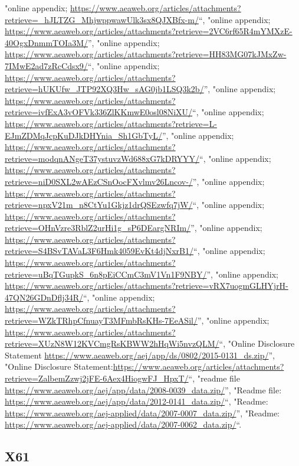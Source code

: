 \documentclass[]{article}
\newcommand{\fullline}{\noindent\makebox[\linewidth]{\rule{\textwidth}{0.4pt}}}
\begin{document}
\begin{itemize}
  "online appendix;
  \url{https://www.aeaweb.org/articles/attachments?retrieve=_hJLTZG_MhjwppwawUlk3sx8QJXBfx-m/}``,
  "online appendix;
  \url{https://www.aeaweb.org/articles/attachments?retrieve=2VC6rf65R4mYMXzE-40OgxDnmmTOIa3M/}'',
  "online appendix;
  \url{https://www.aeaweb.org/articles/attachments?retrieve=HH83MG07kJMxZw-7IMwE2ad7zRcCdsx9/}``,
  "online appendix;
  \url{https://www.aeaweb.org/articles/attachments?retrieve=hUKUfw_JTP92XQ3Hw_sAG0jb1LSQ3k2b/}'',
  "online appendix;
  \url{https://www.aeaweb.org/articles/attachments?retrieve=ivfExA3vOFVk336ZlKKmwE0osl08NiXU/}``,
  "online appendix;
  \url{https://www.aeaweb.org/articles/attachments?retrieve=L-EJmZDMqJcpKuDJkDHYnia_Sh1GbTyL/}'',
  "online appendix;
  \url{https://www.aeaweb.org/articles/attachments?retrieve=modqnANgeT37ystuvzWd688xG7kDRYYY/}``,
  "online appendix;
  \url{https://www.aeaweb.org/articles/attachments?retrieve=niD0SXL2wAEzCSnOocFXvlmv26Lncov-/}'',
  "online appendix;
  \url{https://www.aeaweb.org/articles/attachments?retrieve=npxV21m_n8CtYu1Gkjz1drQSEzwfq7jW/}``,
  "online appendix;
  \url{https://www.aeaweb.org/articles/attachments?retrieve=OHnVzre3RblZ2urHi1g_sP6DEargNRIm/}'',
  "online appendix;
  \url{https://www.aeaweb.org/articles/attachments?retrieve=S4BSvTAVaL3F6Hmk4059EvKt4djNxrB1/}``,
  "online appendix;
  \url{https://www.aeaweb.org/articles/attachments?retrieve=uBqTGupkS_6n8pEiCCmC3mV1Vn1F9NBY/}'',
  "online appendix;
  \url{https://www.aeaweb.org/articles/attachments?retrieve=vRX7uogmGLHYjrH-47QN26GDnDflj34R/}``,
  "online appendix;
  \url{https://www.aeaweb.org/articles/attachments?retrieve=WZkTRhpCfnuayT3MFmbRsKHs-7EeASil/}'',
  "online appendix;
  \url{https://www.aeaweb.org/articles/attachments?retrieve=XUzN8W12KVCmgRsKBWW2hHqWi5nvzQLM/}``,
  "Online Disclosure Statement
  \url{https://www.aeaweb.org/aej/app/ds/0802/2015-0131_ds.zip/}'',
  "Online Disclosure
  Statement:\url{https://www.aeaweb.org/articles/attachments?retrieve=ZalbemZzwj2jFE-6Aex4HiogwFJ_HpxT/}``,
  "readme file
  \url{https://www.aeaweb.org/aej/app/data/2008-0039_data.zip/}'',
  "Readme file:
  \url{https://www.aeaweb.org/aej/app/data/2012-0141_data.zip/}``,
  "Readme:
  \url{https://www.aeaweb.org/aej-applied/data/2007-0007_data.zip/}'',
  "Readme:
  \url{https://www.aeaweb.org/aej-applied/data/2007-0062_data.zip/}``.
\end{itemize}

\fullline

\hypertarget{x61}{\subsection{X61}\label{x61}}
\end{document}
